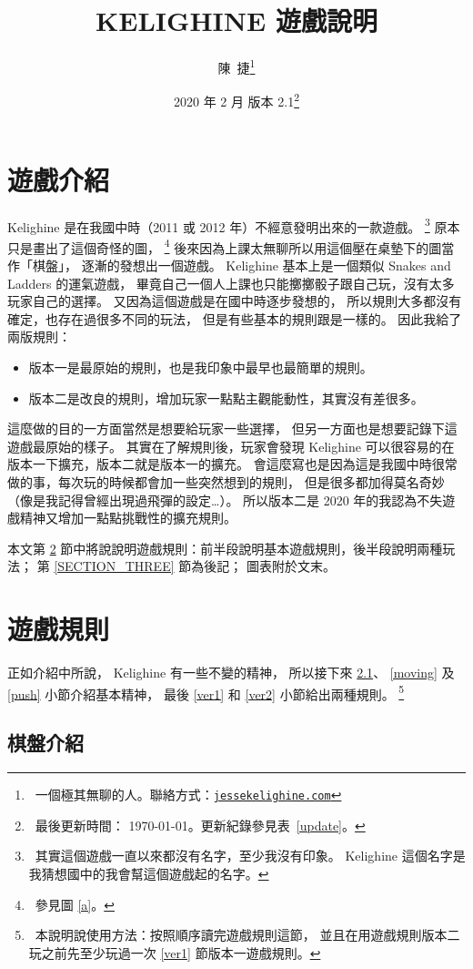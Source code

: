 \documentclass[11pt,a4paper]{article}
\title{KELIGHINE 遊戲說明}
\author{陳\ 捷\thanks{\ 一個極其無聊的人。聯絡方式：\href{https://jessekelighine.com}{\texttt{jessekelighine.com}}}}
\date{2020 年 2 月 \quad 版本 2.1\thanks{\ 最後更新時間： \today。更新紀錄參見表\ \ref{update}。}}
\begin{document}
\maketitle

\section{遊戲介紹} %

Kelighine 是在我國中時（2011 或 2012 年）不經意發明出來的一款遊戲。
	\footnote{\ 其實這個遊戲一直以來都沒有名字，至少我沒有印象。
	Kelighine 這個名字是我猜想國中的我會幫這個遊戲起的名字。}
原本只是畫出了這個奇怪的圖，
	\footnote{\ 參見圖 \ref{a}。}
後來因為上課太無聊所以用這個壓在桌墊下的圖當作「棋盤」，
逐漸的發想出一個遊戲。
Kelighine 基本上是一個類似 Snakes and Ladders 的運氣遊戲，
畢竟自己一個人上課也只能擲擲骰子跟自己玩，沒有太多玩家自己的選擇。
又因為這個遊戲是在國中時逐步發想的，
所以規則大多都沒有確定，也存在過很多不同的玩法，
但是有些基本的規則跟是一樣的。
因此我給了兩版規則：
\begin{itemize}
	\item 版本一是最原始的規則，也是我印象中最早也最簡單的規則。
	\item 版本二是改良的規則，增加玩家一點點主觀能動性，其實沒有差很多。
\end{itemize}
這麼做的目的一方面當然是想要給玩家一些選擇，
但另一方面也是想要記錄下這遊戲最原始的樣子。
其實在了解規則後，玩家會發現 Kelighine 可以很容易的在版本一下擴充，版本二就是版本一的擴充。
會這麼寫也是因為這是我國中時很常做的事，每次玩的時候都會加一些突然想到的規則，
但是很多都加得莫名奇妙（像是我記得曾經出現過飛彈的設定…）。
所以版本二是 2020 年的我認為不失遊戲精神又增加一點點挑戰性的擴充規則。

本文第 \ref{SECTION_TWO} 節中將說說明遊戲規則：前半段說明基本遊戲規則，後半段說明兩種玩法；
第 \ref{SECTION_THREE} 節為後記；
圖表附於文末。

\section{遊戲規則} \label{SECTION_TWO}%

正如介紹中所說， Kelighine 有一些不變的精神，
所以接下來 \ref{board_intro}、 \ref{moving} 及 \ref{push} 小節介紹基本精神，
最後 \ref{ver1} 和 \ref{ver2} 小節給出兩種規則。
	\footnote{\ 本說明說使用方法：按照順序讀完遊戲規則這節，
	並且在用遊戲規則版本二玩之前先至少玩過一次 \ref{ver1} 節版本一遊戲規則。}

\subsection{棋盤介紹} \label{board_intro} %
\end{document}
